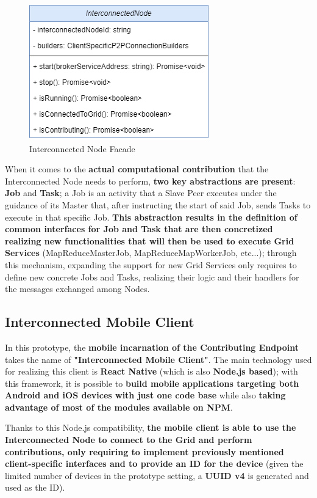 \begin{figure}[!ht]
    \centering
    \includegraphics[scale=0.6]{document/chapters/chapter_6/images/interconnected_node_facade.png}
    \caption{Interconnected Node Facade}
    \label{fig:interconnected_node_facade}
\end{figure}

When it comes to the \textbf{actual computational contribution} that the Interconnected Node needs to perform, \textbf{two key abstractions are present}: \textbf{Job} and \textbf{Task}; a Job is an activity that a Slave Peer executes under the guidance of its Master that, after instructing the start of said Job, sends Tasks to execute in that specific Job. \textbf{This abstraction results in the definition of common interfaces for Job and Task that are then concretized realizing new functionalities that will then be used to execute Grid Services} (MapReduceMasterJob, MapReduceMapWorkerJob, etc...); through this mechanism, expanding the support for new Grid Services only requires to define new concrete Jobs and Tasks, realizing their logic and their handlers for the messages exchanged among Nodes.

\subsection{Interconnected Mobile Client}
In this prototype, the \textbf{mobile incarnation of the Contributing Endpoint} takes the name of \textbf{"Interconnected Mobile Client"}. The main technology used for realizing this client is \textbf{React Native} (which is also \textbf{Node.js based}); with this framework, it is possible to \textbf{build mobile applications targeting both Android and iOS devices with just one code base} while also \textbf{taking advantage of most of the modules available on NPM}.

Thanks to this Node.js compatibility, \textbf{the mobile client is able to use the Interconnected Node to connect to the Grid and perform contributions, only requiring to implement previously mentioned client-specific interfaces and to provide an ID for the device} (given the limited number of devices in the prototype setting, a \textbf{UUID v4} is generated and used as the ID).

